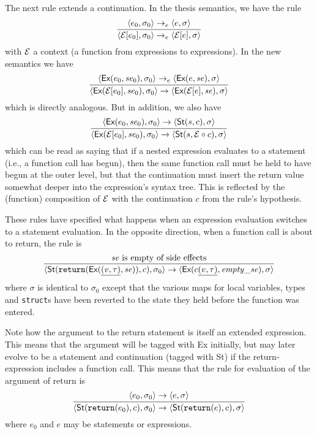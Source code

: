 \documentclass[11pt]{article}
\begin{document}
The next rule extends a continuation.  In the thesis semantics, we
have the rule
\[
\infer{\langle {\cal E}[e_0], \sigma_0\rangle \rightarrow_e
  \langle {\cal E}[e],\sigma\rangle}{
  \langle e_0,\sigma_0\rangle \rightarrow_e \langle e,\sigma\rangle}
\]
with $\cal E$ a context (a function from expressions to expressions).
In the new semantics we have
\[
\infer{\langle \textsf{Ex}({\cal E}[e_0], \mathit{se}_0), \sigma_0\rangle \rightarrow
  \langle \textsf{Ex}({\cal E}[e],\mathit{se}),\sigma\rangle}{
  \langle \textsf{Ex}(e_0,\mathit{se}_0),\sigma_0\rangle \rightarrow_e
  \langle \textsf{Ex}(e,\mathit{se}),\sigma\rangle}
\]
which is directly analogous.  But in addition, we also have
\[
\infer{\langle \textsf{Ex}({\cal E}[e_0],\mathit{se}_0),
  \sigma_0\rangle \rightarrow
  \langle \textsf{St}(s, {\cal E} \circ c), \sigma\rangle}{
  \langle \textsf{Ex}(e_0, \mathit{se}_0),\sigma_0\rangle
  \rightarrow
  \langle \textsf{St}(s, c), \sigma\rangle}
\]
which can be read as saying that if a nested expression evaluates to a
statement (i.e., a function call has begun), then the same function
call must be held to have begun at the outer level, but that the
continuation must insert the return value somewhat deeper into the
expression's syntax tree.  This is reflected by the (function)
composition of $\cal E$ with the continuation $c$ from the rule's
hypothesis.

These rules have specified what happens when an expression evaluation
switches to a statement evaluation.  In the opposite direction, when a
function call is about to return, the rule is
\[
\infer{%
  \langle\textsf{St}(\texttt{return}
  (\textsf{Ex}(\underline{(v,\tau)}, \mathit{se})), c), \sigma_0\rangle
  \rightarrow
  \langle \textsf{Ex}(c\underline{(v,\tau)}, \mathit{empty\_se}),
  \sigma\rangle}{
  \mbox{$\mathit{se}$ is empty of side effects}}
\]
where $\sigma$ is identical to $\sigma_0$ except that the various maps
for local variables, types and \texttt{struct}s have been reverted to
the state they held before the function was entered.

Note how the argument to the return statement is itself an extended
expression.  This means that the argument will be tagged with
\textsf{Ex} initially, but may later evolve to be a statement and
continuation (tagged with \textsf{St}) if the return-expression
includes a function call.  This means that the rule for evaluation of
the argument of return is
\[
\infer{\langle \textsf{St}(\texttt{return}(e_0),c), \sigma_0\rangle
  \rightarrow
  \langle \textsf{St}(\texttt{return}(e),c),\sigma\rangle}{
  \langle e_0, \sigma_0\rangle \rightarrow \langle e,\sigma\rangle}
\]
where $e_0$ and $e$ may be statements or expressions.
\end{document}
